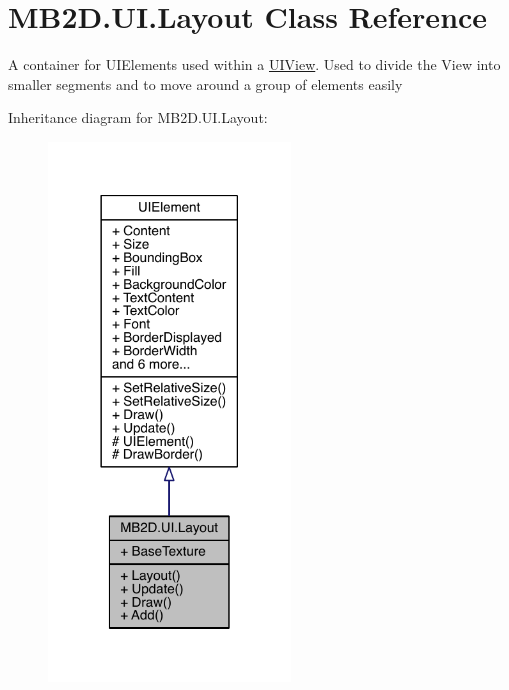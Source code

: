\hypertarget{class_m_b2_d_1_1_u_i_1_1_layout}{}\section{M\+B2\+D.\+U\+I.\+Layout Class Reference}
\label{class_m_b2_d_1_1_u_i_1_1_layout}


A container for U\+I\+Elements used within a \hyperlink{class_m_b2_d_1_1_u_i_1_1_u_i_view}{U\+I\+View}. Used to divide the View into smaller segments and to move around a group of elements easily  




Inheritance diagram for M\+B2\+D.\+U\+I.\+Layout\+:
\nopagebreak
\begin{figure}[H]
\begin{center}
\leavevmode
\includegraphics[width=182pt]{class_m_b2_d_1_1_u_i_1_1_layout__inherit__graph}
\end{center}
\end{figure}


